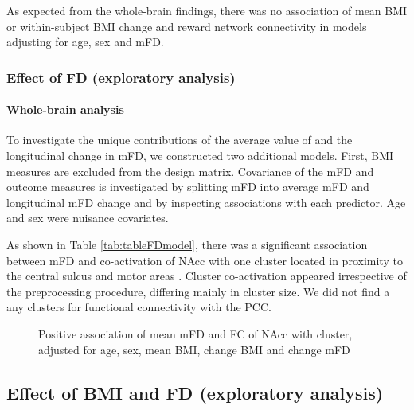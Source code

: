 \documentclass[
]{article}
\begin{document}
As expected from the whole-brain findings, there was no association of mean BMI or within-subject BMI change and reward network connectivity in models adjusting for age, sex and mFD.

\hypertarget{effect-of-fd-exploratory-analysis}{%
\subsubsection{Effect of FD (exploratory analysis)}\label{effect-of-fd-exploratory-analysis}}

\hypertarget{whole-brain-analysis-1}{%
\paragraph{Whole-brain analysis}\label{whole-brain-analysis-1}}

To investigate the unique contributions of the average value of and the longitudinal change in mFD, we constructed two additional models.
First, BMI measures are excluded from the design matrix. Covariance of the mFD and outcome measures is investigated by splitting mFD into average mFD and longitudinal mFD change and by inspecting associations with each predictor. Age and sex were nuisance covariates.

As shown in Table \ref{tab:tableFDmodel}, there was a significant association between mFD and co-activation of NAcc with one cluster located in proximity to the central sulcus and motor areas . Cluster co-activation appeared irrespective of the preprocessing procedure, differing mainly in cluster size.
We did not find a any clusters for functional connectivity with the PCC.

\begin{figure}
\caption{Positive association of mean mFD and FC of NAcc with cluster, adjusted for age, sex, mean BMI, change BMI and change mFD}\label{fig:FDagesexNACCccavgFDact}
\end{figure}

\hypertarget{effect-of-bmi-and-fd-exploratory-analysis}{%
\subsection{Effect of BMI and FD (exploratory analysis)}\label{effect-of-bmi-and-fd-exploratory-analysis}}
\end{document}
